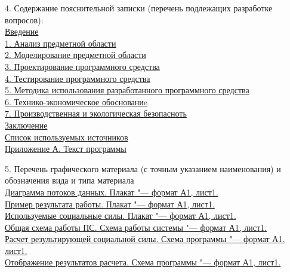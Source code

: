 {  \small{4. Содержание пояснительной записки (перечень подлежащих разработке вопросов):} \\[1em]
  \uline{\small{Введение}}\lineunderscore\\
  \uline{\small{1. Анализ предметной области}}\lineunderscore\\
  \uline{\small{2. Моделирование предметной области}}\lineunderscore\\
  \uline{\small{3. Проектирование программного средства}}\lineunderscore\\
  \uline{\small{4. Тестирование программного средства}}\lineunderscore\\
  \uline{\small{5. Методика использования разработанного программного средства}}\lineunderscore\\
  \uline{\small{6. Технико-экономическое обоснованиe}}\lineunderscore\\
  \uline{\small{7. Производственная и экологическая безопасноть}}\lineunderscore\\
  \uline{\small{Заключение}}\lineunderscore\\
  \uline{\small{Список используемых источников}}\lineunderscore\\
  \uline{\small{Приложение А. Текст программы}}\lineunderscore

  \clearpage
  \thispagestyle{empty}

  \small{5. Перечень графического материала (с точным указанием наименования) и обозначения вида и типа материала} \\
  \uline{\small{Диаграмма потоков данных. Плакат "--- формат А1, лист1.}}\lineunderscore\\
  \uline{\small{Пример результата работы. Плакат "--- формат А1, лист1.}}\lineunderscore\\
  \uline{\small{Используемые социальные силы. Плакат "--- формат А1, лист1.}}\lineunderscore\\
  \uline{\small{Общая схема работы ПС. Схема работы системы "--- формат А1, лист1.}}\lineunderscore\\
  \uline{\small{Расчет результирующей социальной силы. Схема программы "--- формат А1, лист1.}}\lineunderscore\\
  \uline{\small{Отображение результатов расчета. Схема программы "--- формат А1, лист1.}}\lineunderscore\\
  \lineunderscore\\
  \lineunderscore

  \vspace{1em}

}
